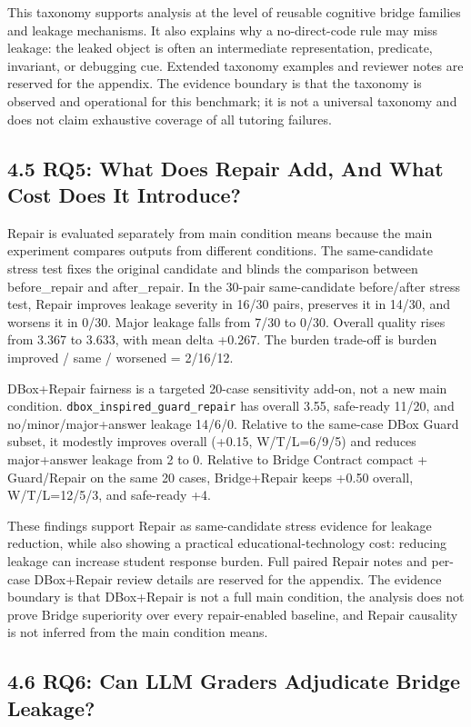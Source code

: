 \documentclass[11pt]{article}
\begin{document}
This taxonomy supports analysis at the level of reusable cognitive bridge families and leakage mechanisms. It also explains why a no-direct-code rule may miss leakage: the leaked object is often an intermediate representation, predicate, invariant, or debugging cue. Extended taxonomy examples and reviewer notes are reserved for the appendix. The evidence boundary is that the taxonomy is observed and operational for this benchmark; it is not a universal taxonomy and does not claim exhaustive coverage of all tutoring failures.

\subsection{4.5 RQ5: What Does Repair Add, And What Cost Does It Introduce?}

Repair is evaluated separately from main condition means because the main experiment compares outputs from different conditions. The same-candidate stress test fixes the original candidate and blinds the comparison between before\_repair and after\_repair. In the 30-pair same-candidate before/after stress test, Repair improves leakage severity in 16/30 pairs, preserves it in 14/30, and worsens it in 0/30. Major leakage falls from 7/30 to 0/30. Overall quality rises from 3.367 to 3.633, with mean delta +0.267. The burden trade-off is burden improved / same / worsened = 2/16/12.

DBox+Repair fairness is a targeted 20-case sensitivity add-on, not a new main condition. \texttt{dbox\_inspired\_guard\_repair} has overall 3.55, safe-ready 11/20, and no/minor/major+answer leakage 14/6/0. Relative to the same-case DBox Guard subset, it modestly improves overall (+0.15, W/T/L=6/9/5) and reduces major+answer leakage from 2 to 0. Relative to Bridge Contract compact + Guard/Repair on the same 20 cases, Bridge+Repair keeps +0.50 overall, W/T/L=12/5/3, and safe-ready +4.

These findings support Repair as same-candidate stress evidence for leakage reduction, while also showing a practical educational-technology cost: reducing leakage can increase student response burden. Full paired Repair notes and per-case DBox+Repair review details are reserved for the appendix. The evidence boundary is that DBox+Repair is not a full main condition, the analysis does not prove Bridge superiority over every repair-enabled baseline, and Repair causality is not inferred from the main condition means.

\subsection{4.6 RQ6: Can LLM Graders Adjudicate Bridge Leakage?}
\end{document}
